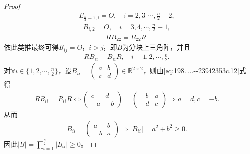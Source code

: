 \documentclass[../../main.tex]{subfiles}
\begin{document}
\begin{proof}
\begin{align*}
B_{\frac{n}{2}-1,i} = O, \quad i = 2,3,\cdots,\frac{n}{2}-2,
\end{align*}
\begin{align*}
B_{i,2} = O, \quad i = 3,4,\cdots,\frac{n}{2}-1,
\end{align*}
\begin{align*}
RB_{22} = B_{22}R.
\end{align*}
依此类推最终可得\(B_{ij} = O\)，\(i > j\)，即\(B\)为分块上三角阵，并且
\begin{align}
RB_{ii} = B_{ii}R, \quad i = 1,2,\cdots,\frac{n}{2}. \label{eq:198.....--23942353c.12}
\end{align}
对\(\forall i \in \{1,2,\cdots,\frac{n}{2}\}\)，设\(B_{ii} = \begin{pmatrix} a & b \\ c & d \end{pmatrix} \in \mathbb{R}^{2 \times 2}\)，则由\eqref{eq:198.....--23942353c.12}式得
\begin{align*}
RB_{ii} = B_{ii}R \Longleftrightarrow \begin{pmatrix} c & d \\ -a & -b \end{pmatrix} = \begin{pmatrix} -b & a \\ -d & c \end{pmatrix} \Longrightarrow a = d, c = -b.
\end{align*}
从而
\begin{align*}
B_{ii} = \begin{pmatrix} a & b \\ -b & a \end{pmatrix} \Longrightarrow |B_{ii}| = a^2 + b^2 \geqslant 0.
\end{align*}
因此\(|B| = \prod_{i=1}^{\frac{n}{2}} |B_{ii}| \geqslant 0\)。


\end{proof}
\end{document}
